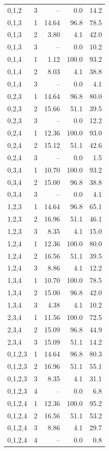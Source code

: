 \begin{longtable}{@{}lrrrr@{}}
0,1,2 & 3 & -- & 0.0 & 14.2\\
0,1,3 & 1 & 14.64 & 96.8 & 78.5\\
0,1,3 & 2 & 3.80 & 4.1 & 42.0\\
0,1,3 & 3 & -- & 0.0 & 10.2\\
0,1,4 & 1 & 1.12 & 100.0 & 93.2\\
0,1,4 & 2 & 8.03 & 4.1 & 38.8\\
0,1,4 & 3 & -- & 0.0 & 4.1\\
0,2,3 & 1 & 14.64 & 96.8 & 80.0\\
0,2,3 & 2 & 15.66 & 51.1 & 39.5\\
0,2,3 & 3 & -- & 0.0 & 12.2\\
0,2,4 & 1 & 12.36 & 100.0 & 93.0\\
0,2,4 & 2 & 15.12 & 51.1 & 42.6\\
0,2,4 & 3 & -- & 0.0 & 1.5\\
0,3,4 & 1 & 10.70 & 100.0 & 93.2\\
0,3,4 & 2 & 15.00 & 96.8 & 38.8\\
0,3,4 & 3 & -- & 0.0 & 4.1\\
1,2,3 & 1 & 14.64 & 96.8 & 65.1\\
1,2,3 & 2 & 16.96 & 51.1 & 46.1\\
1,2,3 & 3 & 8.35 & 4.1 & 15.0\\
1,2,4 & 1 & 12.36 & 100.0 & 80.0\\
1,2,4 & 2 & 16.56 & 51.1 & 39.5\\
1,2,4 & 3 & 8.86 & 4.1 & 12.2\\
1,3,4 & 1 & 10.70 & 100.0 & 78.5\\
1,3,4 & 2 & 15.00 & 96.8 & 42.0\\
1,3,4 & 3 & 4.38 & 4.1 & 10.2\\
2,3,4 & 1 & 11.56 & 100.0 & 72.5\\
2,3,4 & 2 & 15.09 & 96.8 & 44.9\\
2,3,4 & 3 & 15.09 & 51.1 & 14.2\\
0,1,2,3 & 1 & 14.64 & 96.8 & 80.3\\
0,1,2,3 & 2 & 16.96 & 51.1 & 55.1\\
0,1,2,3 & 3 & 8.35 & 4.1 & 31.1\\
0,1,2,3 & 4 & -- & 0.0 & 6.8\\
0,1,2,4 & 1 & 12.36 & 100.0 & 95.2\\
0,1,2,4 & 2 & 16.56 & 51.1 & 53.2\\
0,1,2,4 & 3 & 8.86 & 4.1 & 29.7\\
0,1,2,4 & 4 & -- & 0.0 & 0.8\\

\end{longtable}
